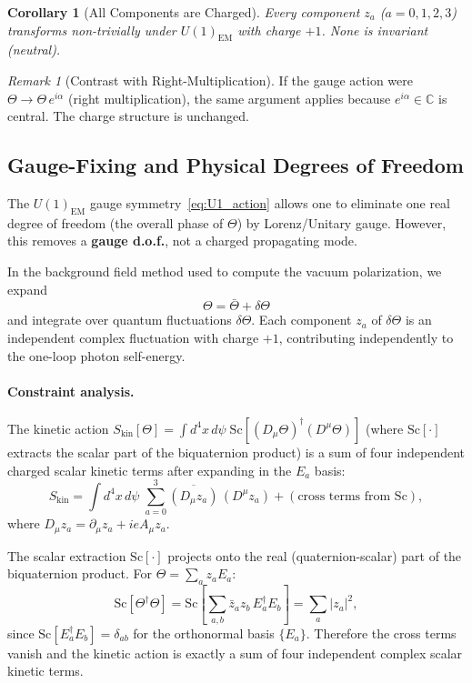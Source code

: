\documentclass[11pt,a4paper]{article}
\newcommand{\C}{\mathbb{C}}
\newcommand{\Sc}{\mathrm{Sc}}
\newtheorem{corollary}[theorem]{Corollary}
\theoremstyle{remark}
\newtheorem{remark}{Remark}
\begin{document}
\begin{corollary}[All Components are Charged]
Every component $z_a$ ($a = 0,1,2,3$) transforms non-trivially under $U(1)_{\mathrm{EM}}$
with charge $+1$. None is invariant (neutral).
\end{corollary}

\begin{remark}[Contrast with Right-Multiplication]
If the gauge action were $\Theta \to \Theta\,e^{i\alpha}$ (right multiplication), the same
argument applies because $e^{i\alpha} \in \C$ is central.  The charge structure is unchanged.
\end{remark}

\subsection{Gauge-Fixing and Physical Degrees of Freedom}

The $U(1)_{\mathrm{EM}}$ gauge symmetry~\eqref{eq:U1_action} allows one to eliminate one
real degree of freedom (the overall phase of $\Theta$) by Lorenz/Unitary gauge.
However, this removes a \textbf{gauge d.o.f.}, not a charged propagating mode.

In the background field method used to compute the vacuum polarization, we expand
\begin{equation}
  \Theta = \bar\Theta + \delta\Theta
\end{equation}
and integrate over quantum fluctuations $\delta\Theta$.  Each component $z_a$ of $\delta\Theta$
is an independent complex fluctuation with charge $+1$, contributing independently to the
one-loop photon self-energy.

\paragraph{Constraint analysis.}
The kinetic action $S_{\mathrm{kin}}[\Theta] = \int d^4x\,d\psi\;\Sc[(D_\mu\Theta)^\dagger(D^\mu\Theta)]$
(where $\Sc[\cdot]$ extracts the scalar part of the biquaternion product) is a sum of four
independent charged scalar kinetic terms after expanding in the $E_a$ basis:
\begin{equation}
  S_{\mathrm{kin}} = \int d^4x\,d\psi \;\sum_{a=0}^{3}
  \overline{(D_\mu z_a)}\,(D^\mu z_a) + (\text{cross terms from } \Sc),
  \label{eq:Skin_expanded}
\end{equation}
where $D_\mu z_a = \partial_\mu z_a + ie A_\mu z_a$.

The scalar extraction $\Sc[\cdot]$ projects onto the real (quaternion-scalar) part of the
biquaternion product. For $\Theta = \sum_a z_a E_a$:
\begin{equation}
  \Sc[\Theta^\dagger \Theta]
  = \Sc\!\left[\sum_{a,b} \bar z_a z_b \,E_a^\dagger E_b\right]
  = \sum_a |z_a|^2,
\end{equation}
since $\Sc[E_a^\dagger E_b] = \delta_{ab}$ for the orthonormal basis $\{E_a\}$.
Therefore the cross terms vanish and the kinetic action is exactly a sum of four independent
complex scalar kinetic terms.
\end{document}
